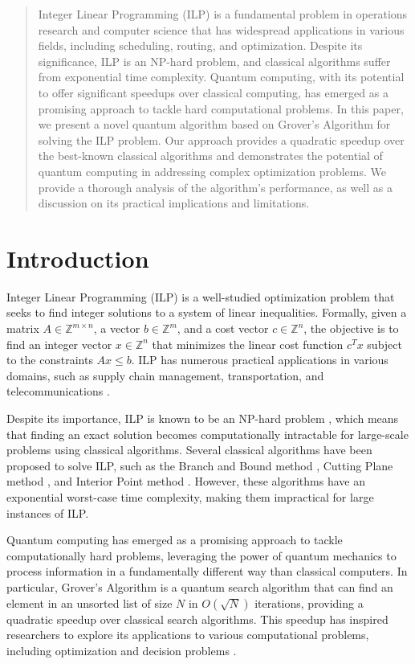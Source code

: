 \begin{abstract}
Integer Linear Programming (ILP) is a fundamental problem in operations research and computer science that has widespread applications in various fields, including scheduling, routing, and optimization. Despite its significance, ILP is an NP-hard problem, and classical algorithms suffer from exponential time complexity. Quantum computing, with its potential to offer significant speedups over classical computing, has emerged as a promising approach to tackle hard computational problems. In this paper, we present a novel quantum algorithm based on Grover's Algorithm for solving the ILP problem. Our approach provides a quadratic speedup over the best-known classical algorithms and demonstrates the potential of quantum computing in addressing complex optimization problems. We provide a thorough analysis of the algorithm's performance, as well as a discussion on its practical implications and limitations.

\end{abstract}

\section{Introduction}

Integer Linear Programming (ILP) is a well-studied optimization problem that seeks to find integer solutions to a system of linear inequalities. Formally, given a matrix $A \in \mathbb{Z}^{m \times n}$, a vector $b \in \mathbb{Z}^{m}$, and a cost vector $c \in \mathbb{Z}^{n}$, the objective is to find an integer vector $x \in \mathbb{Z}^{n}$ that minimizes the linear cost function $c^T x$ subject to the constraints $Ax \leq b$. ILP has numerous practical applications in various domains, such as supply chain management, transportation, and telecommunications \cite{ilp_applications}.

Despite its importance, ILP is known to be an NP-hard problem \cite{ilp_np_hard}, which means that finding an exact solution becomes computationally intractable for large-scale problems using classical algorithms. Several classical algorithms have been proposed to solve ILP, such as the Branch and Bound method \cite{branch_and_bound}, Cutting Plane method \cite{cutting_planes}, and Interior Point method \cite{interior_point}. However, these algorithms have an exponential worst-case time complexity, making them impractical for large instances of ILP.

Quantum computing has emerged as a promising approach to tackle computationally hard problems, leveraging the power of quantum mechanics to process information in a fundamentally different way than classical computers. In particular, Grover's Algorithm \cite{grover1996fast} is a quantum search algorithm that can find an element in an unsorted list of size $N$ in $O(\sqrt{N})$ iterations, providing a quadratic speedup over classical search algorithms. This speedup has inspired researchers to explore its applications to various computational problems, including optimization and decision problems \cite{grover_applications}.

